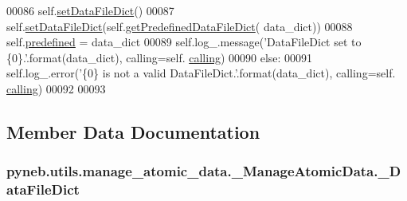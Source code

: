 \begin{DoxyCode}
00086             self.\hyperlink{classpyneb_1_1utils_1_1manage__atomic__data_1_1___manage_atomic_data_a196510345a35dc1749684b5619ce64d5}{setDataFileDict}()
00087             self.\hyperlink{classpyneb_1_1utils_1_1manage__atomic__data_1_1___manage_atomic_data_a196510345a35dc1749684b5619ce64d5}{setDataFileDict}(self.\hyperlink{classpyneb_1_1utils_1_1manage__atomic__data_1_1___manage_atomic_data_a95c5df20a27033c4c32831d85a1c2876}{getPredefinedDataFileDict}(
      data\_dict))
00088             self.\hyperlink{classpyneb_1_1utils_1_1manage__atomic__data_1_1___manage_atomic_data_a42d17444c105bd5238ae202a722ecb47}{predefined} = data\_dict
00089             self.log\_.message(\textcolor{stringliteral}{'DataFileDict set to \{0\}.'}.format(data\_dict), calling=self.
      \hyperlink{classpyneb_1_1utils_1_1manage__atomic__data_1_1___manage_atomic_data_ab10b91ca784741ce7af163d010802434}{calling})
00090         \textcolor{keywordflow}{else}:
00091             self.log\_.error(\textcolor{stringliteral}{'\{0\} is not a valid DataFileDict.'}.format(data\_dict), calling=self.
      \hyperlink{classpyneb_1_1utils_1_1manage__atomic__data_1_1___manage_atomic_data_ab10b91ca784741ce7af163d010802434}{calling})
00092  
00093             
\end{DoxyCode}


\subsection{Member Data Documentation}
\hypertarget{classpyneb_1_1utils_1_1manage__atomic__data_1_1___manage_atomic_data_a25a8e0770b6d8a375cfc9092d600684d}{}
\subsubsection[{\+\_\+\+Data\+File\+Dict}]{\setlength{\rightskip}{0pt plus 5cm}pyneb.\+utils.\+manage\+\_\+atomic\+\_\+data.\+\_\+\+Manage\+Atomic\+Data.\+\_\+\+Data\+File\+Dict\hspace{0.3cm}{\ttfamily [private]}}\label{classpyneb_1_1utils_1_1manage__atomic__data_1_1___manage_atomic_data_a25a8e0770b6d8a375cfc9092d600684d}



